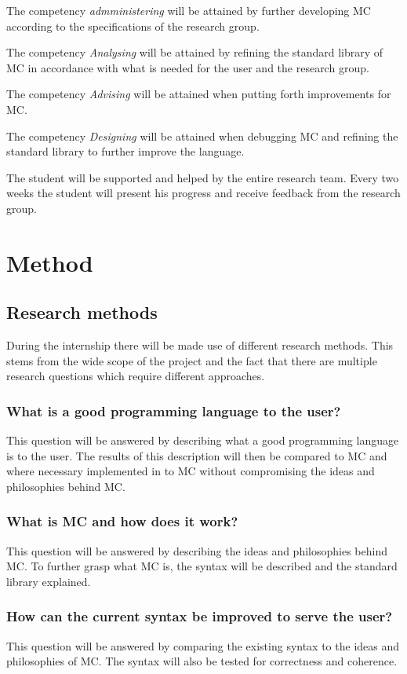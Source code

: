 The competency \emph{admministering} will be attained by further developing MC according to the specifications of the research group.

The competency \emph{Analysing} will be attained by refining the standard library of MC in accordance with what is needed for the user and the research group.

The competency \emph{Advising} will be attained when putting forth improvements for MC.

The competency \emph{Designing} will be attained when debugging MC and refining the standard library to further improve the language.

The student will be supported and helped by the entire research team.
Every two weeks the student will present his progress and receive feedback from the research group.


\section{Method}\label{ch:methodmandate}
\subsection{Research methods}
During the internship there will be made use of different research methods.
This stems from the wide scope of the project and the fact that there are multiple research questions which require different approaches.

\subsubsection{What is a good programming language to the user?}
This question will be answered by describing what a good programming language is to the user.
The results of this description will then be compared to MC and where necessary implemented in to MC without compromising the ideas and philosophies behind MC.

\subsubsection{What is MC and how does it work?}
This question will be answered by describing the ideas and philosophies behind MC.
To further grasp what MC is, the syntax will be described and the standard library explained.

\subsubsection{How can the current syntax be improved to serve the user?}
This question will be answered by comparing the existing syntax to the ideas and philosophies of MC.
The syntax will also be tested for correctness and coherence.

